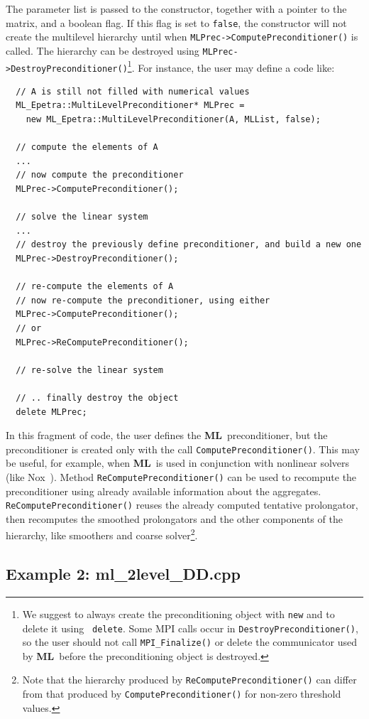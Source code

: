 \documentclass{article}[11pt]
\newcommand{\ML}     {{\bf ML}}
\begin{document}
The parameter list is passed to the constructor, together with a pointer
to the matrix, and a boolean flag.  If this flag is set to \verb!false!,
the constructor will not create the multilevel hierarchy until when
\verb!MLPrec->ComputePreconditioner()!  is called.  The hierarchy can be
destroyed using \verb!MLPrec->DestroyPreconditioner()!\footnote{We suggest to
  always create the preconditioning object with {\tt new} and to delete it using {\tt
    delete}. Some MPI calls occur in {\tt DestroyPreconditioner()}, so the user should
  not call {\tt MPI\_Finalize()} or delete the communicator used by \ML\
  before the preconditioning object is destroyed.}.
For instance, the
user may define a code like:
\begin{verbatim}
  // A is still not filled with numerical values
  ML_Epetra::MultiLevelPreconditioner* MLPrec = 
    new ML_Epetra::MultiLevelPreconditioner(A, MLList, false);
  
  // compute the elements of A
  ...
  // now compute the preconditioner
  MLPrec->ComputePreconditioner();

  // solve the linear system
  ...
  // destroy the previously define preconditioner, and build a new one
  MLPrec->DestroyPreconditioner();

  // re-compute the elements of A
  // now re-compute the preconditioner, using either
  MLPrec->ComputePreconditioner();
  // or
  MLPrec->ReComputePreconditioner();

  // re-solve the linear system

  // .. finally destroy the object
  delete MLPrec;
\end{verbatim}
In this fragment of code, the user defines the \ML\ preconditioner, but
the preconditioner is created only with the call \verb!ComputePreconditioner()!.
 This may
be useful, for example, when \ML\ is used in conjunction with
nonlinear solvers (like {\sc Nox}~\cite{NOX-home-page}). Method
\verb!ReComputePreconditioner()! can be used to recompute the preconditioner
using already available information about the aggregates.
\verb!ReComputePreconditioner()! reuses the already computed tentative
prolongator, then recomputes the smoothed prolongators and the other
components of the hierarchy, like smoothers and coarse solver\footnote{Note
  that the hierarchy produced by {\tt ReComputePreconditioner()} can 
  differ from that produced by {\tt ComputePreconditioner()} for
  non-zero threshold values.}. 

\subsection{Example 2: ml\_2level\_DD.cpp}
\label{parameter list ex. 2}
\end{document}
